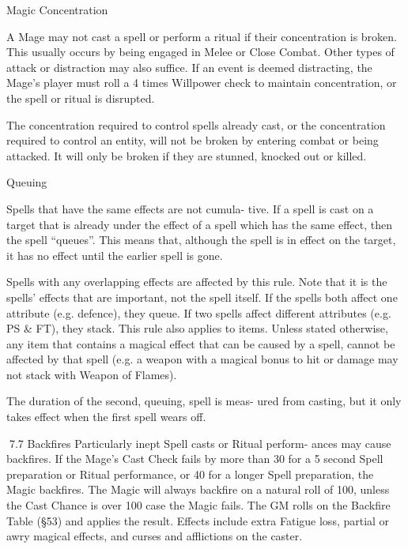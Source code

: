 \begin{Chapter}{Magic}
Concentration 

A Mage may not cast a spell or perform a ritual if 
their  concentration  is  broken.  This  usually  occurs 
by being engaged in Melee or Close Combat. Other 
types of attack or distraction may also suffice. If an 
event  is  deemed  distracting,  the  Mage’s  player 
must  roll  a  4  times  Willpower  check  to  maintain 
concentration, or the spell or ritual is disrupted. 

The concentration required to control spells already 
cast,  or  the  concentration  required  to  control  an 
entity,  will  not  be  broken  by  entering  combat  or 
being  attacked.  It  will  only  be  broken  if  they  are 
stunned, knocked out or killed. 

Queuing 

Spells  that  have  the  same  effects  are  not  cumula-
tive.  If  a  spell  is  cast  on  a  target  that  is  already 
under  the  effect  of  a  spell  which  has  the  same 
effect,  then  the  spell  “queues”.  This  means  that, 
although  the  spell  is  in  effect  on  the  target,  it  has 
no effect until the earlier spell is gone. 

Spells with any overlapping effects are affected by 
this  rule.  Note  that  it  is  the  spells’  effects  that  are 
important,  not  the  spell  itself.  If  the  spells  both 
affect  one  attribute  (e.g.  defence),  they  queue.  If 
two spells affect different attributes (e.g. PS \& FT), 
they  stack.  This  rule  also  applies  to  items.  Unless 
stated  otherwise,  any  item  that  contains  a  magical 
effect  that  can  be  caused  by  a  spell,  cannot  be 
affected by that spell (e.g. a weapon with a magical 
bonus to hit or damage may not stack with Weapon 
of Flames). 

The duration of the second, queuing, spell is meas-
ured from casting, but it only takes effect when the 
first spell wears off. 

7.7 Backfires 
Particularly  inept  Spell  casts  or  Ritual  perform-
ances  may  cause  backfires.  If  the  Mage’s  Cast 
Check  fails  by  more  than  30  for  a  5  second  Spell 
preparation  or  Ritual  performance,  or  40  for  a 
longer Spell preparation, the Magic backfires. The 
Magic will always backfire on a natural roll of 100, 
unless  the  Cast  Chance  is  over  100%
case the Magic fails. The GM rolls on the Backfire 
Table  (§53)  and  applies  the  result.  Effects  include 
extra  Fatigue  loss,  partial  or  awry  magical  effects, 
and curses and afflictions on the caster. 


\end{Chapter}
